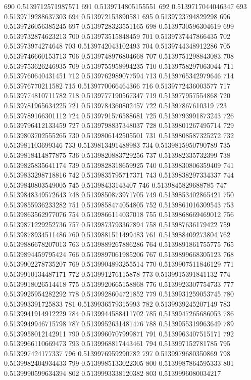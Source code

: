 690 0.5139712571987571
691 0.5139714805155551
692 0.5139717044046347
693 0.5139719288637303
694 0.513972153890581
695 0.5139723794829298
696 0.5139726056385245
697 0.5139728323551165
698 0.5139730596304619
699 0.5139732874623213
700 0.513973515848459
701 0.5139737447866435
702 0.513973974274648
703 0.5139742043102493
704 0.5139744348912286
705 0.5139746660153713
706 0.5139748976804668
707 0.5139751298843083
708 0.5139753626246935
709 0.5139755958994235
710 0.5139758297063044
711 0.5139760640431451
712 0.5139762989077594
713 0.5139765342979646
714 0.513976770211582
715 0.5139770066464366
716 0.5139772436003577
717 0.5139774810711782
718 0.5139777190567347
719 0.513977957554868
720 0.5139781965634225
721 0.5139784360802457
722 0.51397867610319
723 0.5139789166301112
724 0.5139791576588681
725 0.5139793991873243
726 0.5139796412133459
727 0.5139798837348037
728 0.5139801267495714
729 0.5139803702555265
730 0.5139806142505501
731 0.5139808587325272
732 0.513981103699346
733 0.5139813491488983
734 0.5139815950790789
735 0.5139818414877875
736 0.5139820883729256
737 0.513982335732399
738 0.5139825835641174
739 0.5139828318659925
740 0.5139830806359409
741 0.5139833298718816
742 0.5139835795717371
743 0.5139838297334337
744 0.5139840803549005
745 0.51398433143407
746 0.5139845829688785
747 0.5139848349572643
748 0.5139850873971705
749 0.5139853402865421
750 0.5139855936233282
751 0.5139858474054805
752 0.5139861016309543
753 0.5139863562977076
754 0.5139866114037018
755 0.5139868669469012
756 0.5139871229252736
757 0.5139873793367894
758 0.513987636179422
759 0.5139878934511486
760 0.5139881511499483
761 0.513988409273804
762 0.5139886678207013
763 0.5139889267886286
764 0.5139891861755775
765 0.5139894459795424
766 0.5139897061985206
767 0.5139899668305123
768 0.5139902278735207
769 0.5139904893255514
770 0.5139907511846129
771 0.5139910134487171
772 0.513991276115878
773 0.5139915391841132
774 0.5139918026514418
775 0.5139920665158868
776 0.5139923307754733
777 0.5139925954282292
778 0.5139928604721852
779 0.5139931259053745
780 0.513993391725833
781 0.5139936579315993
782 0.5139939245207149
783 0.5139941914912229
784 0.5139944588411702
785 0.5139947265686053
786 0.5139949946715798
787 0.5139952631481476
788 0.5139955319963649
789 0.5139958012142911
790 0.5139960707999871
791 0.5139963407515171
792 0.5139966110669473
793 0.5139968817443461
794 0.513997152781785
795 0.513997424177337
796 0.5139976959290782
797 0.5139979680350869
798 0.5139982404934433
799 0.5139985133022305
800 0.5139987864595333
801 0.5139990599634394
802 0.5139993338120382
803 0.5139996080034217
